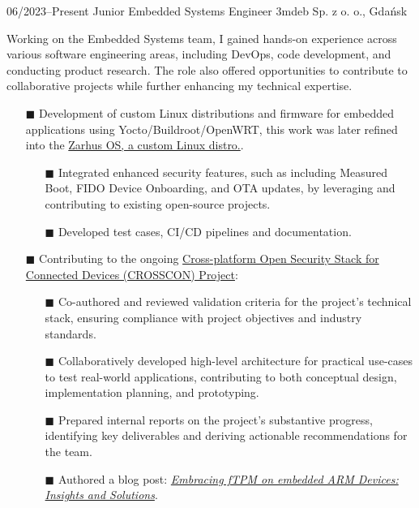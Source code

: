 \documentclass[9pt]{./packages/Developer_CV/developercv}
\begin{document}
\begin{entrylist}

    \entry
    {06/2023--Present}
    {Junior Embedded Systems Engineer}
    {3mdeb Sp. z o. o., Gdańsk}
    {
    Working on the Embedded Systems team, I gained hands-on experience across various software engineering areas, including DevOps, code development, and conducting product research. The role also offered opportunities to contribute to collaborative projects while further enhancing my technical expertise.
    \begin{enumerate}
        \raggedright
    \item[$\blacksquare$] Development of custom Linux distributions and firmware for embedded applications using Yocto/Buildroot/OpenWRT, this work was later refined into the \href{https://docs.zarhus.com/}{Zarhus OS, a custom Linux distro.}.
        \begin{enumerate}
            \item[$\blacksquare$] Integrated enhanced security features, such as including Measured Boot, FIDO Device Onboarding, and OTA updates, by leveraging and contributing to existing open-source projects.
            \item[$\blacksquare$] Developed test cases, CI/CD pipelines and documentation.
        \end{enumerate}
        \item[$\blacksquare$] Contributing to the ongoing \href{https://crosscon.eu/}{Cross-platform Open Security Stack for Connected Devices (CROSSCON) Project}:
        \begin{enumerate}
            \item[$\blacksquare$] Co-authored and reviewed validation criteria for the project's technical stack, ensuring compliance with project objectives and industry standards.
            \item[$\blacksquare$] Collaboratively developed high-level architecture for practical use-cases to test real-world applications, contributing to both conceptual design, implementation planning, and prototyping.
            \item[$\blacksquare$] Prepared internal reports on the project's substantive progress, identifying key deliverables and deriving actionable recommendations for the team.
            \item[$\blacksquare$] Authored a blog post: \href{https://crosscon.eu/blog/embracing-ftpm-embedded-arm-devices-insights-and-solutions}{\textit{Embracing fTPM on embedded ARM Devices: Insights and Solutions}}.

\end{enumerate}
\end{enumerate}}
\end{entrylist}
\end{document}
